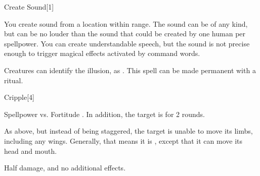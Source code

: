 \begin{spellsection}{Create Sound}[1]
    \begin{spellheader}
    \end{spellheader}
    \begin{spellcontent}
        \begin{spelltargetinginfo}
            \spellrng{\rngmed}
        \end{spelltargetinginfo}
        \begin{spelleffects}
            \spelleffect You create sound from a location within range. The sound can be of any kind, but can be no louder than the sound that could be created by one human per spellpower. You can create understandable speech, but the sound is not precise enough to trigger magical effects activated by command words.
            \spelldur \durshort \dismissable
        \end{spelleffects}
    \end{spellcontent}
    \begin{spellfooter}
        \spellnotes Creatures can identify the illusion, as . This spell can be made permanent with a  ritual.
        \miscastexplode
    \end{spellfooter}
\end{spellsection}

\begin{spellsection}{Cripple}[4]
    \begin{spellheader}
    \end{spellheader}
    \begin{spellcontent}
        \begin{spelltargetinginfo}
        \end{spelltargetinginfo}
        \begin{spelleffects}
            \begin{spellattack}{Spellpower vs. Fortitude}
                \spellsuccess {}. In addition, the target is \staggered for 2 rounds.

                \spellcritical As above, but instead of being staggered, the target is unable to move its limbs, including any wings. Generally, that means it is \paralyzed, except that it can move its head and mouth.

                \spellfailure Half damage, and no additional effects.
            \end{spellattack}
        \end{spelleffects}
    \end{spellcontent}
    \begin{spellfooter}
        \miscastrandom
    \end{spellfooter}
\end{spellsection}

